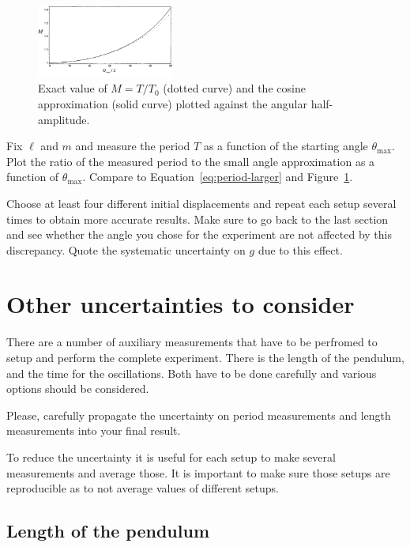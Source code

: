 \documentclass[10pt,aps,twocolumn,secnumarabic,balancelastpage,amsmath,amssymb,nofootinbib,floatfix]{revtex4}
\begin{document}
\begin{figure}[!h]
  \centering\includegraphics[width=0.4\textwidth]{figs/large-angle.pdf}
  \caption{\label{fig:period-larger} Exact value of $M=T/T_0$ (dotted curve) and the cosine approximation (solid curve) plotted against the angular half-amplitude.}
\end{figure}

Fix $\ell$ and $m$ and measure the period $T$ as a function of the starting angle $\theta_\text{max}$.  Plot the ratio of the measured period to the small angle approximation as a function of $\theta_\text{max}$. Compare to Equation~\ref{eq:period-larger} and Figure~\ref{fig:period-larger}.

Choose at least four different initial displacements and repeat each setup several times to obtain more accurate results. Make sure to go back to the last section and see whether the angle you chose for the experiment are not affected by this discrepancy. Quote the systematic uncertainty on $g$ due to this effect.

\section{Other uncertainties to consider}

There are a number of auxiliary measurements that have to be perfromed to setup and perform the complete experiment. There is the length of the pendulum, and the time for the
oscillations. Both have to be done carefully and various options should be considered.

Please, carefully propagate the uncertainty on period measurements and length measurements into your final result.

To reduce the uncertainty it is useful for each setup to make several measurements and average those. It is important to make sure those setups are reproducible as to not average values of different setups.

\subsection{Length of the pendulum}
\end{document}

